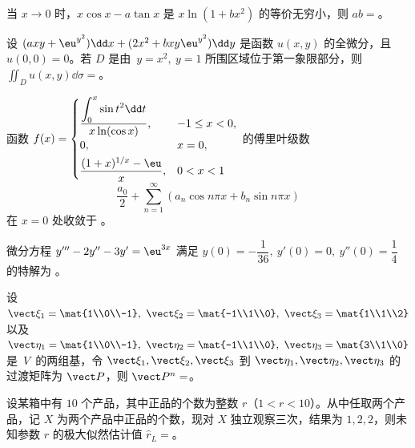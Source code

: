\begin{question}[index=11]
当 $x\to 0$ 时，$x\cos x-a\tan x$ 是 $x\ln(1+bx^2)$ 的等价无穷小，则 $ab=$\fillin。
\end{question}
\QuestionBreak

\begin{question}[index=12]
设 $(axy+\eu^{y^2})\dd x+(2x^2+bxy\eu^{y^2})\dd y$ 是函数 $u(x,y)$ 的全微分，且 $u(0,0)=0$。若 $D$ 是\allowbreak\mbox{由 $y=x^2,\ y=1$} 所围区域位于第一象限部分，则 $\displaystyle\iint_Du(x,y)\dd\sigma=$\fillin。
\end{question}
\QuestionBreak

\begin{question}[index=13]
函数 $f(x)=\begin{cases}
\dfrac{\displaystyle\int_0^x\sin t^2\dd t}{x\ln(\cos x)},&-1\leq x<0,\\[3pt]
0,&x=0,\\[3pt]
\dfrac{(1+x)^{1/x}-\eu}{x},&0<x<1
\end{cases}$
的傅里叶级数
\[
\frac{a_0}{2}+\sum_{n=1}^{\infty}(a_n\cos n\pi x+b_n\sin n\pi x)
\]
在 $x=0$ 处收敛于 \fillin。
\end{question}
\QuestionBreak

\begin{question}[index=14]
微分方程 $y'''-2y''-3y'=\eu^{3x}$ 满足 $y(0)=-\dfrac{1}{36},\ y'(0)=0,\ y''(0)=\dfrac14$ 的特解为 \fillin。
\end{question}
\QuestionBreak

\begin{question}[index=15]
设 $\vect\xi_1=\mat{1\\0\\-1},\ \vect\xi_2=\mat{-1\\1\\0},\ \vect\xi_3=\mat{1\\1\\2}$ 以及 $\vect\eta_1=\mat{1\\0\\-1},\ \vect\eta_2=\mat{-1\\1\\0},\ \vect\eta_3=\mat{3\\1\\0}$ \allowbreak\mbox{是 $V$ 的两组基}，令 $\vect\xi_1,\vect\xi_2,\vect\xi_3$ 到 $\vect\eta_1,\vect\eta_2,\vect\eta_3$ 的过渡矩阵为 $\vect P$，则 $\vect P^n=$\fillin。
\end{question}
\QuestionBreak

\begin{question}[index=16]
设某箱中有 $10$ 个产品，其中正品的个数为整数 $r$（$1<r<10$）。从中任取两个产品，记 $X$ 为两个产品中正品的个数，现对 $X$ 独立观察三次，结果为 $1,2,2$，则未知参数 $r$ 的\allowbreak\mbox{极大似然估计值} $\widehat r_L=$\fillin。
\end{question}
